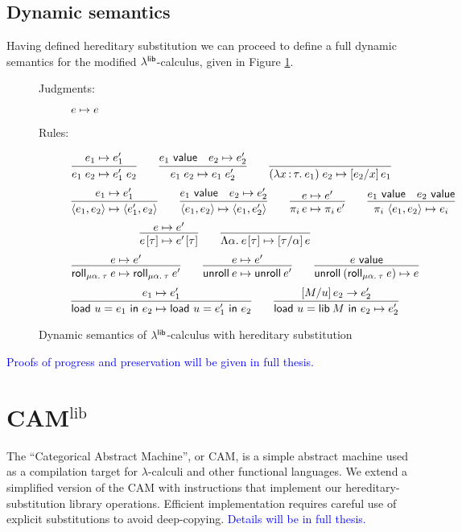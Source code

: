 \documentclass[11pt]{article}
\newcommand{\bscolor}{blue}
\newcommand{\bs}[1]{\textcolor{\bscolor}{#1}}
\begin{document}
\subsection{Dynamic semantics}

Having defined hereditary substitution we can proceed to define a full dynamic
semantics for the modified $\lambda^{\textsf{lib}}$-calculus, given in Figure \ref{fig:dynsem}.

\begin{figure}[h]
  \centering
  \begin{description}
  \item[Judgments:] $e \mapsto e$
  \item[Rules:]
    \[
    \infer{e_1 \ap e_2 \step e_1' \ap e_2}{e_1 \step e_1'} \qquad
    \infer{e_1 \ap e_2 \step e_1 \ap e_2'}{e_1 \isvalue & e_2 \step e_2'} \qquad
    \infer{(\lam{x}{\tau}{e_1}) \ap e_2 \step \sub{e_2}{x}{e_1}}{}
    \]\[
    \infer{\<e_1, e_2\> \step \<e_1', e_2\>}{e_1 \step e_1'} \qquad
    \infer{\<e_1, e_2\> \step \<e_1, e_2'\>}{e_1 \isvalue & e_2 \step e_2'} \qquad
    \infer{\proj{i}{e} \step \proj{i}{e'}}{e \step e'} \qquad
    \infer{\proj{i}{\<e_1, e_2\>} \step e_i}{e_1 \isvalue & e_2 \isvalue}
    \]\[
    \infer{\Ap{e}{\tau} \step \Ap{e'}{\tau}}{e \step e'} \qquad
    \infer{\Ap{\Lam{\alpha}{e}}{\tau} \step \sub{\tau}{\alpha}{e}}{}
    \]\[
    \infer{\roll{\alpha}{\tau}{e} \step \roll{\alpha}{\tau}{e'}}{e \step e'} \qquad
    \infer{\unroll{e} \step \unroll{e'}}{e \step e'} \qquad
    \infer{\unroll{(\roll{\alpha}{\tau}{e})} \step e}{e \isvalue}
    \]\[
    \infer{\load{u}{e_1}{e_2} \step \load{u}{e_1'}{e_2}}{e_1 \step e_1'} \qquad
    \infer{\load{u}{\lib{M}}{e_2} \step e_2'}{\sub{M}{u}{e_2} \to e_2'}
    \]
  \end{description}
  \caption{Dynamic semantics of $\lambda^{\textsf{lib}}$-calculus with hereditary substitution}
  \label{fig:dynsem}
\end{figure}

\bs{Proofs of progress and preservation will be given in full thesis.}


\newcommand{\camlib}{CAM\ensuremath{^{\text{lib}}}}
\section{\camlib{}}

The ``Categorical Abstract Machine'', or CAM, is a simple abstract machine used
as a compilation target for $\lambda$-calculi and other functional languages. We
extend a simplified version of the CAM with instructions that implement our
hereditary-substitution library operations. Efficient implementation requires
careful use of explicit substitutions to avoid deep-copying. \bs{Details will be
  in full thesis.}
\end{document}
